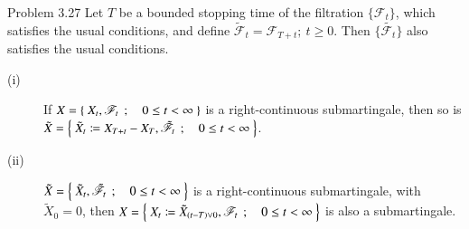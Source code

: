 	\begin{itembox}[l]{Problem 3.27}
		Let $T$ be a bounded stopping time of the filtration $\{\mathscr{F}_t\}$, which satisfies
		the usual conditions, and define $\tilde{\mathscr{F}}_t = \mathscr{F}_{T+t};\ t \geq 0$.
		Then $\{\tilde{\mathscr{F}_t}\}$ also satisfies the usual conditions.
		\begin{description}
			\item[(i)] If $X = \left\{\ X_t,\mathscr{F}_t\ \, ; \quad 0 \leq t < \infty\ \right\}$ is a right-continuous submartingale,
				then so is $\tilde{X} = \left\{\ \tilde{X}_t \coloneqq X_{T+t} - X_T,\tilde{\mathscr{F}}_t\ \, ; \quad 0 \leq t < \infty\ \right\}$.
			\item[(ii)] $\tilde{X} = \left\{\ \tilde{X}_t, \tilde{\mathscr{F}}_t\ \, ; \quad 0 \leq t < \infty\ \right\}$ is a right-continuous submartingale,
				with $\tilde{X}_0 = 0$\footnotemark, then
				$X = \left\{\ X_t \coloneqq \tilde{X}_{(t-T) \vee 0},\mathscr{F}_t\ \, ; \quad 0 \leq t < \infty\ \right\}$ is also a submartingale.
		\end{description}
	\end{itembox}
